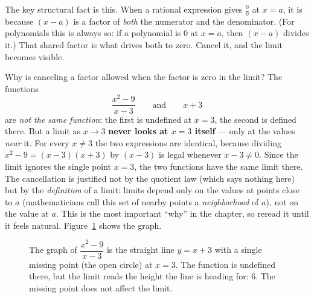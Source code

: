 The key structural fact is this. When a rational expression gives $\frac00$ at
$x=a$, it is because $(x-a)$ is a factor of \emph{both} the numerator and the
denominator. (For polynomials this is always so: if a polynomial is $0$ at $x=a$,
then $(x-a)$ divides it.) That shared factor is what drives both to zero.
Cancel it, and the limit becomes visible.

\begin{whybox}
Why is canceling a factor allowed when the factor is zero in the limit?
The functions
\[
  \frac{x^2 - 9}{x - 3} \qquad\text{and}\qquad x + 3
\]
are \emph{not the same function}: the first is undefined at $x=3$, the second
is defined there. But a limit as $x\to 3$ \textbf{never looks at
$x=3$ itself} --- only at the values \emph{near} it. For every $x\neq 3$ the
two expressions are identical, because dividing $x^2-9=(x-3)(x+3)$ by $(x-3)$
is legal whenever $x-3\neq 0$. Since the limit ignores the single point $x=3$,
the two functions have the same limit there. The cancellation is justified not
by the quotient law (which says nothing here) but by the \emph{definition} of a
limit: limits depend only on the values at points close to $a$ (mathematicians
call this set of nearby points a \emph{neighborhood} of $a$), not on the value at $a$. This is the most important
``why'' in the chapter, so reread it until it feels natural.
Figure~\ref{ch07:fig-hole} shows the graph.
\end{whybox}

\begin{figure}[htbp]
\centering
{}
\caption{The graph of $\dfrac{x^{2}-9}{x-3}$ is the straight line $y=x+3$ with
a single missing point (the open circle) at $x=3$. The function is undefined there, but the
limit reads the height the line is heading for: $6$. The missing point does
not affect the limit.}
\label{ch07:fig-hole}
\end{figure}

